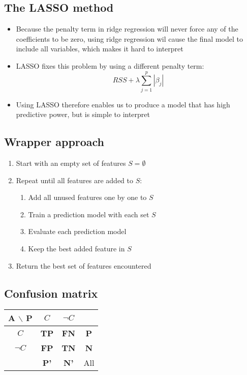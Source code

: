 \documentclass{article}
\begin{document}
    \subsection{The LASSO method}
    \begin{itemize}
        \item Because the penalty term in ridge regression will never force any of the coefficients to be zero, using ridge regression wil cause the final model to include all variables, which makes it hard to interpret
        \item LASSO fixes this problem by using a different penalty term:
        \[ RSS + \lambda \sum_{j=1}^{p} |\beta_j| \]
        \item Using LASSO therefore enables us to produce a model that has high predictive power, but is simple to interpret
    \end{itemize}

    \subsection{Wrapper approach}
    \begin{enumerate}
        \item Start with an empty set of features $S= \emptyset$
        \item Repeat until all features are added to $S$:
        \begin{enumerate}[{2.1}]
            \item Add all unused features one by one to $S$
            \item Train a prediction model with each set $S$
            \item Evaluate each prediction model
            \item Keep the best added feature in $S$
        \end{enumerate}
        \item Return the best set of features encountered
    \end{enumerate}

    \subsection{Confusion matrix}
    \begin{tabular}{|c|c c|c|}  %
        \hline  %
        A $\backslash$ P & $C$ & $\neg{C}$ & \\
        \hline   %
        $C$ & \textbf{TP} & \textbf{FN} & \textbf{P} \\
        $\neg{C}$ & \textbf{FP} & \textbf{TN} & \textbf{N} \\
        \hline  %
        & \textbf{P'} & \textbf{N'} & All \\
        \hline  %
    \end{tabular}
\end{document}
